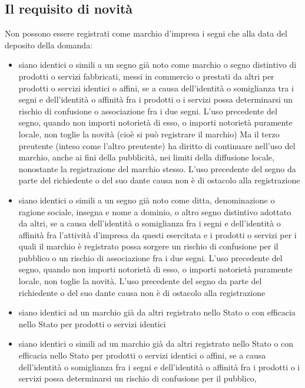 \subsection{Il requisito di novità}
Non possono essere registrati come marchio d'impresa i segni che alla data del deposito della domanda:
\begin{itemize}
    \item siano identici o simili a un segno già noto come marchio o segno distintivo di prodotti o servizi
    fabbricati, messi in commercio o prestati da altri per prodotti o servizi identici o affini, se a causa dell'identità o somiglianza tra i segni
    e dell'identità o affinità fra i prodotti o i servizi possa determinarsi un rischio di confusione o associazione fra i due segni.\newline
    L'uso precedente del segno, quando non importi notorietà di esso, o importi notorietà puramente locale, non toglie la novità (cioè si può registrare il marchio)
    Ma il terzo preutente (inteso come l'altro preutente) ha diritto di continuare nell'uso del marchio, anche ai fini della pubblicità, nei limiti
    della diffusione locale, nonostante la registrazione del marchio stesso. L'uso precedente del segno da parte
    del richiedente o del suo dante causa non è di ostacolo alla registrazione
    \item siano identici o simili a un segno già noto come ditta, denominazione o ragione sociale, insegna e nome a dominio, o altro segno distintivo adottato
    da altri, se a causa dell'identità o somiglianza fra i segni e dell'identità o affinità fra l'attività d'impresa da questi esercitata e i prodotti o servizi per i quali
    il marchio è registrato possa sorgere un rischio di confusione per il pubblico o un rischio di associazione fra i due segni.\newline
    L'uso precedente del segno, quando non importi notorietà di esso, o importi notorietà puramente locale, non toglie la novità. L'uso precedente del segno da parte del richiedente
    o del suo dante causa non è di ostacolo alla registrazione
    \item siano identici ad un marchio già da altri registrato nello Stato o con efficacia nello Stato per prodotti o servizi identici
    \item siano identici o simili ad un marchio già da altri registrato nello Stato o con efficacia nello Stato per prodotti o servizi identici
    o affini, se a causa dell'identità o somiglianza fra i segni e dell'identità o affinità fra i prodotti o i servizi possa determinarsi un rischio di confusione per il pubblico,

\end{itemize}

